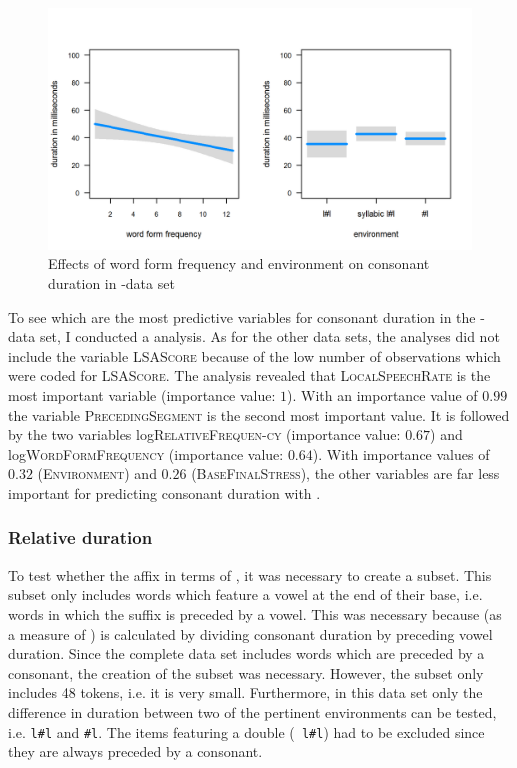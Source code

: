 \begin{figure}
	

	\includegraphics[scale=.8] {images/Corpus/lyModelTransitionTypeAndFreq.png}
	\caption{Effects of word form frequency  and environment on consonant duration in -data set}
	\label{fig:corpus main effects  ly}
\end{figure}




To see which are the most predictive variables for consonant duration in the -data set, I conducted a  analysis. As for the other data sets, the analyses did not include the variable \textsc{LSAScore} because of the low number of observations which were coded for \textsc{LSAScore}. The analysis revealed that \textsc{LocalSpeechRate} is the most important variable (importance value: $1$). With an importance value of $0.99$ the variable \textsc{PrecedingSegment} is the second most important value. It is followed by the two  variables log\textsc{RelativeFrequen-cy} (importance value: $0.67$) and log\textsc{WordFormFrequency} (importance value: $0.64$). With importance values of $0.32$ (\textsc{Environment}) and $0.26$ (\textsc{BaseFinalStress}), the other variables are far less important for predicting consonant duration with .


\subsubsection{Relative duration}

To test whether the affix   in terms of , it was necessary to create a subset. This subset only includes words which feature a vowel at the end of their base, i.e. words in which the suffix is preceded by a vowel. This was necessary because  (as a measure of ) is calculated by dividing consonant duration by preceding vowel duration. Since the complete data set includes words which are preceded by a consonant, the creation of the subset was necessary.
However, the subset only includes 48 tokens, i.e. it is very small. Furthermore, in this data set only the difference in duration between two of the pertinent environments can be tested, i.e. \texttt{l\#l} and \texttt{\#l}. The items featuring a  double (\texttt{ l\#l}) had to be excluded since they are always preceded by a consonant. 

